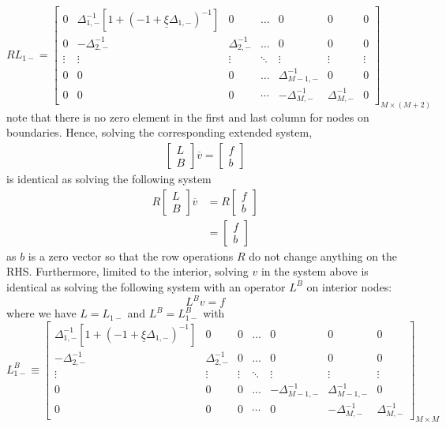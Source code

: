 \documentclass[11pt]{article}
\theoremstyle{definition}
\begin{document}
\begin{equation}
R {L}_{1-} = \begin{bmatrix}
0&\Delta_{1,-}^{-1} \left[ 1 + (-1+\underline{\xi} \Delta_{1,-} )^{-1} \right] &0&\dots&0&0&0\\
0&-\Delta_{2,-}^{-1}&\Delta_{2,-}^{-1}&\dots&0&0&0\\
\vdots&\vdots&\vdots&\ddots&\vdots&\vdots&\vdots\\
0&0&0&\dots&\Delta_{M-1,-}^{-1}&0&0\\
0&0&0&\cdots&-\Delta_{M,-}^{-1}&\Delta_{M,-}^{-1}&0
\end{bmatrix}_{M\times (M+2)}
\end{equation}
note that there is no zero element in the first and last column for nodes on boundaries. Hence, solving the corresponding extended system,
\begin{align}
\begin{bmatrix}
{L}\\
B
\end{bmatrix} 
\overline{v}
=
\begin{bmatrix}
f \\ b
\end{bmatrix}
\end{align}
is identical as solving the following system
\begin{align}
R
\begin{bmatrix}
{L}\\
B
\end{bmatrix} 
\overline{v}
&=
R
\begin{bmatrix}
f \\ b
\end{bmatrix} \\
&= \begin{bmatrix}
f \\ b
\end{bmatrix}
\end{align}
as $b$ is a zero vector so that the row operations $R$ do not change anything on the RHS. Furthermore, limited to the interior, solving $v$ in the system above is identical as solving the following system with an operator $L^B$ on interior nodes:
\begin{equation}
L^B v = f
\end{equation}
where we have ${L} = {L}_{1-}$ and $L^B = L_{1-}^B$ with
\begin{equation}
L_{1-}^B \equiv \begin{bmatrix}
\Delta_{1,-}^{-1} [1 + (-1 + \underline{\xi} \Delta_{1,-})^{-1}] &0&0&\dots&0&0&0\\
-\Delta_{2,-}^{-1}&\Delta_{2,-}^{-1}&0&\dots&0&0&0\\
\vdots&\vdots&\vdots&\ddots&\vdots&\vdots&\vdots\\
0&0&0&\dots&-\Delta_{M-1,-}^{-1}&\Delta_{M-1,-}^{-1}&0\\
0&0&0&\cdots&0&-\Delta_{M,-}^{-1}&\Delta_{M,-}^{-1}
\end{bmatrix}_{M\times M}
\end{equation}
\end{document}
